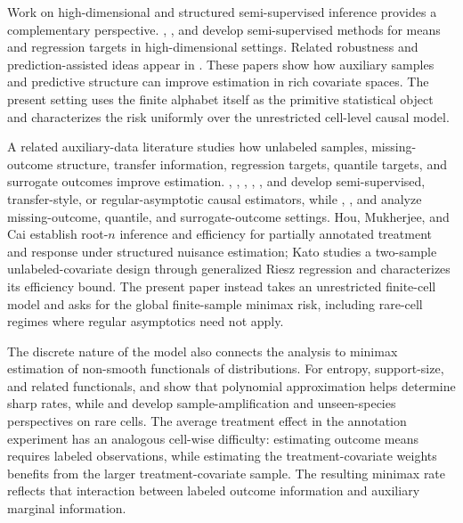 Work on high-dimensional and structured semi-supervised inference provides a complementary perspective. \citet{ZhangBrownCai2019}, \citet{ChakraborttyCai2018}, and \citet{DengNingZhaoZhang2024} develop semi-supervised methods for means and regression targets in high-dimensional settings. Related robustness and prediction-assisted ideas appear in \citet{AngelopoulosBatesFannjiangJordanZrnic2023}. These papers show how auxiliary samples and predictive structure can improve estimation in rich covariate spaces. The present setting uses the finite alphabet itself as the primitive statistical object and characterizes the risk uniformly over the unrestricted cell-level causal model.

A related auxiliary-data literature studies how unlabeled samples, missing-outcome structure, transfer information, regression targets, quantile targets, and surrogate outcomes improve estimation. \citet{ChengAnanthakrishnanCai2021}, \citet[Sections 2--4]{HouMukherjeeCai2025}, \citet[Sections 3--5]{Kato2025}, \citet{ChakraborttyDai2024}, \citet{AnniwaerZhang2025}, and \citet{XuWittenShojaie2025} develop semi-supervised, transfer-style, or regular-asymptotic causal estimators, while \citet{ChakraborttyLuCaiLi2019}, \citet{ChakraborttyDaiCarroll2022}, and \citet{KallusMao2025} analyze missing-outcome, quantile, and surrogate-outcome settings. Hou, Mukherjee, and Cai establish root-\(n\) inference and efficiency for partially annotated treatment and response under structured nuisance estimation; Kato studies a two-sample unlabeled-covariate design through generalized Riesz regression and characterizes its efficiency bound. The present paper instead takes an unrestricted finite-cell model and asks for the global finite-sample minimax risk, including rare-cell regimes where regular asymptotics need not apply.

The discrete nature of the model also connects the analysis to minimax estimation of non-smooth functionals of distributions. For entropy, support-size, and related functionals, \citet{JiaoVenkatHanWeissman2015} and \citet{WuYang2016} show that polynomial approximation helps determine sharp rates, while \citet{ValiantValiant2017} and \citet{OrlitskySureshWu2016} develop sample-amplification and unseen-species perspectives on rare cells. The average treatment effect in the annotation experiment has an analogous cell-wise difficulty: estimating outcome means requires labeled observations, while estimating the treatment-covariate weights benefits from the larger treatment-covariate sample. The resulting minimax rate reflects that interaction between labeled outcome information and auxiliary marginal information.

